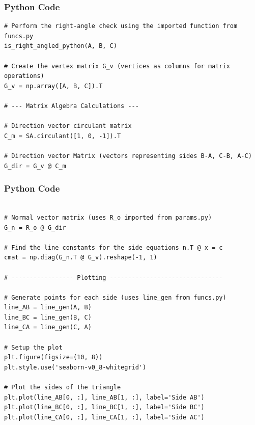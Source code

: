 \documentclass{beamer}
\begin{document}
\begin{frame}[fragile]
\frametitle{Python Code}
\begin{lstlisting}
# Perform the right-angle check using the imported function from funcs.py
is_right_angled_python(A, B, C)

# Create the vertex matrix G_v (vertices as columns for matrix operations)
G_v = np.array([A, B, C]).T

# --- Matrix Algebra Calculations ---

# Direction vector circulant matrix
C_m = SA.circulant([1, 0, -1]).T

# Direction vector Matrix (vectors representing sides B-A, C-B, A-C)
G_dir = G_v @ C_m
\end{lstlisting}
\end{frame}  

\begin{frame}[fragile]
\frametitle{Python Code}
\begin{lstlisting}

# Normal vector matrix (uses R_o imported from params.py)
G_n = R_o @ G_dir

# Find the line constants for the side equations n.T @ x = c
cmat = np.diag(G_n.T @ G_v).reshape(-1, 1)

# ----------------- Plotting -------------------------------

# Generate points for each side (uses line_gen from funcs.py)
line_AB = line_gen(A, B)
line_BC = line_gen(B, C)
line_CA = line_gen(C, A)

# Setup the plot
plt.figure(figsize=(10, 8))
plt.style.use('seaborn-v0_8-whitegrid')

# Plot the sides of the triangle
plt.plot(line_AB[0, :], line_AB[1, :], label='Side AB')
plt.plot(line_BC[0, :], line_BC[1, :], label='Side BC')
plt.plot(line_CA[0, :], line_CA[1, :], label='Side AC')
\end{lstlisting}
\end{frame}  
\end{document}
